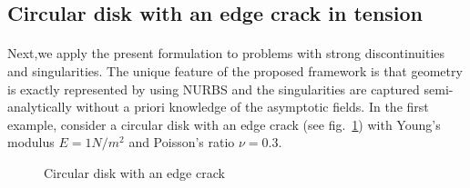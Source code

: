\subsection{Circular disk with an edge crack in tension}

\paragraph{}
Next,we apply the present formulation to problems with strong discontinuities and singularities.
The unique feature of the proposed framework is that geometry is exactly represented by using NURBS and the singularities are captured semi-analytically without a priori knowledge of the asymptotic fields.
In the first example, consider a circular disk with an edge crack (see fig.~\ref{iso_fig:circular_disk_geo_bc}) with Young’s modulus $E=1N/m^2$ and Poisson's ratio $\nu=0.3$.
    \begin{figure}[h!]
        \centering
        \caption{Circular disk with an edge crack}
        \label{iso_fig:circular_disk_geo_bc}
    \end{figure}

